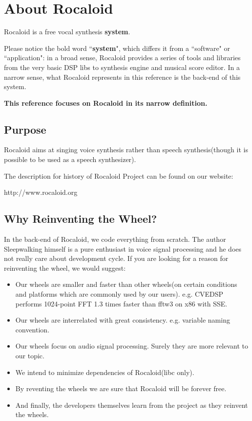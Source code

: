 \section{About Rocaloid}\indent

        Rocaloid is a free vocal synthesis \textbf{system}.
        
        Please notice the bold word ``\textbf{system}", which differs it from a ``software" or ``application": in a broad sense, Rocaloid provides a series of tools and libraries from the very basic DSP libs to synthesis engine and musical score editor. In a narrow sense, what Rocaloid represents in this reference is the back-end of this system.
        
        \bigskip
        
        \textbf{This reference focuses on Rocaloid in its narrow definition.}
        
        \bigskip

\subsection{Purpose}\indent

        Rocaloid aims at singing voice synthesis rather than speech synthesis(though it is possible to be used as a speech synthesizer).
        
        The description for history of Rocaloid Project can be found on our website:
        
        http://www.rocaloid.org
        
\subsection{Why Reinventing the Wheel?}\indent

        In the back-end of Rocaloid, we code everything from scratch. The author Sleepwalking himself is a pure enthusiast in voice signal processing and he does not really care about development cycle. If you are looking for a reason for reinventing the wheel, we would suggest:
        
        \begin{itemize}
                \item Our wheels are smaller and faster than other wheels(on certain conditions and platforms which are commonly used by our users). e.g. CVEDSP performs 1024-point FFT 1.3 times faster than fftw3 on x86 with SSE.
                \item Our wheels are interrelated with great consistency. e.g. variable naming convention.
                \item Our wheels focus on audio signal processing. Surely they are more relevant to our topic.
                \item We intend to minimize dependencies of Rocaloid(libc only).
                \item By reventing the wheels we are sure that Rocaloid will be forever free.
                \item And finally, the developers themselves learn from the project as they reinvent the wheels.
        \end{itemize}

